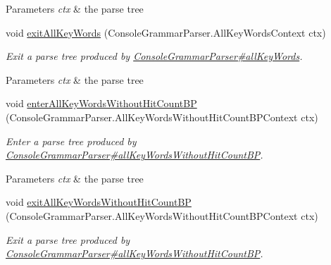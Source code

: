 \begin{DoxyCompactItemize}
\begin{DoxyCompactList}
\begin{DoxyParams}{Parameters}
{\em ctx} & the parse tree\\
\hline
\end{DoxyParams}
 \end{DoxyCompactList}\item 
void \hyperlink{classgov_1_1nasa_1_1jpf_1_1inspector_1_1client_1_1parser_1_1_console_grammar_base_listener_a234e383563191ebeffa494e28734b10c}{exit\+All\+Key\+Words} (Console\+Grammar\+Parser.\+All\+Key\+Words\+Context ctx)
\begin{DoxyCompactList}\small\item\em Exit a parse tree produced by \hyperlink{classgov_1_1nasa_1_1jpf_1_1inspector_1_1client_1_1parser_1_1_console_grammar_parser_ae08871adf83e51273a2c368571fabd6a}{Console\+Grammar\+Parser\#all\+Key\+Words}.


\begin{DoxyParams}{Parameters}
{\em ctx} & the parse tree\\
\hline
\end{DoxyParams}
 \end{DoxyCompactList}\item 
void \hyperlink{classgov_1_1nasa_1_1jpf_1_1inspector_1_1client_1_1parser_1_1_console_grammar_base_listener_a170aa6880e389e001671106f540eee45}{enter\+All\+Key\+Words\+Without\+Hit\+Count\+BP} (Console\+Grammar\+Parser.\+All\+Key\+Words\+Without\+Hit\+Count\+B\+P\+Context ctx)
\begin{DoxyCompactList}\small\item\em Enter a parse tree produced by \hyperlink{classgov_1_1nasa_1_1jpf_1_1inspector_1_1client_1_1parser_1_1_console_grammar_parser_a800f8f87a8c2b4569bab4a7074239325}{Console\+Grammar\+Parser\#all\+Key\+Words\+Without\+Hit\+Count\+BP}.


\begin{DoxyParams}{Parameters}
{\em ctx} & the parse tree\\
\hline
\end{DoxyParams}
 \end{DoxyCompactList}\item 
void \hyperlink{classgov_1_1nasa_1_1jpf_1_1inspector_1_1client_1_1parser_1_1_console_grammar_base_listener_a46726fd8aa5d153d10c5cbaaaa2f79a4}{exit\+All\+Key\+Words\+Without\+Hit\+Count\+BP} (Console\+Grammar\+Parser.\+All\+Key\+Words\+Without\+Hit\+Count\+B\+P\+Context ctx)
\begin{DoxyCompactList}\small\item\em Exit a parse tree produced by \hyperlink{classgov_1_1nasa_1_1jpf_1_1inspector_1_1client_1_1parser_1_1_console_grammar_parser_a800f8f87a8c2b4569bab4a7074239325}{Console\+Grammar\+Parser\#all\+Key\+Words\+Without\+Hit\+Count\+BP}.



\end{DoxyCompactList}
\end{DoxyCompactItemize}
